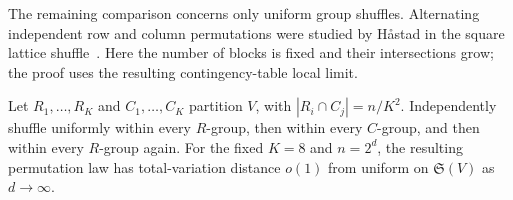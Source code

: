 The remaining comparison concerns only uniform group shuffles. Alternating independent row and column permutations were studied by H\aa stad in the square lattice shuffle~\cite{hastad2006}. Here the number of blocks is fixed and their intersections grow; the proof uses the resulting contingency-table local limit.

\begin{lemma}\label{lem:transverse-rounds}
Let \(R_1,\ldots,R_K\) and \(C_1,\ldots,C_K\) partition \(V\), with \(|R_i\cap C_j|=n/K^2\). Independently shuffle uniformly within every \(R\)-group, then within every \(C\)-group, and then within every \(R\)-group again. For the fixed \(K=8\) and \(n=2^d\), the resulting permutation law has total-variation distance \(o(1)\) from uniform on \(\mathfrak S(V)\) as \(d\to\infty\).
\end{lemma}

